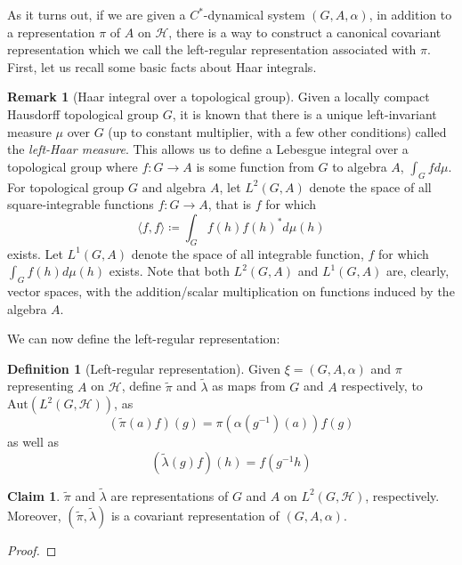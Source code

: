 \documentclass[aps,pra,showpacs,notitlepage,onecolumn,superscriptaddress,nofootinbib]{revtex4-1}
\theoremstyle{definition}
\newtheorem{definition}{Definition}[section]
\newtheorem{remark}{Remark}[section]
\newtheorem{claim}{Claim}[section]
\begin{document}
As it turns out, if we are given a $C^{*}$-dynamical system $(G, A, \alpha)$, in addition to a representation $\pi$ of $A$ on $\mathcal{H}$, there is a way to construct a canonical covariant representation
which we call the left-regular representation associated with $\pi$. First, let us recall some basic facts about Haar integrals.

\begin{remark}[Haar integral over a topological group]
  Given a locally compact Hausdorff topological group $G$, it is known that there is a unique left-invariant measure $\mu$ over $G$ (up to constant multiplier, with a few other conditions) called
  the \emph{left-Haar measure}. This allows us to define a Lebesgue integral over a topological group where $f : G \rightarrow A$ is some function from $G$ to algebra $A$, $\int_{G} f d \mu$. For topological
  group $G$ and algebra $A$, let $L^2(G, A)$ denote the space of all square-integrable functions $f : G \rightarrow A$, that is $f$ for which
  \begin{equation}
   \langle f, f \rangle \coloneqq \displaystyle\int_{G} f(h) f(h)^{*} d\mu(h)
  \end{equation}
  exists. Let $L^1(G, A)$ denote the space of all integrable function, $f$ for which $\int_{G} f(h) d\mu(h)$ exists. Note that both $L^2(G, A)$ and $L^1(G, A)$ are, clearly, vector spaces, with the
  addition/scalar multiplication on functions induced by the algebra $A$.
\end{remark}

\noindent We can now define the left-regular representation:

\begin{definition}[Left-regular representation]
  Given $\xi = (G, A, \alpha)$ and $\pi$ representing $A$ on $\mathcal{H}$, define $\widetilde{\pi}$ and $\widetilde{\lambda}$ as maps from $G$ and $A$ respectively, to $\text{Aut}(L^2(G, \mathcal{H}))$, as
  \begin{equation}
    (\widetilde{\pi}(a) f)(g) = \pi(\alpha(g^{-1})(a)) f(g)
  \end{equation}
  as well as
  \begin{equation}
    (\widetilde{\lambda}(g) f)(h) = f(g^{-1} h)
    \end{equation}
\end{definition}

\begin{claim}
  $\widetilde{\pi}$ and $\widetilde{\lambda}$ are representations of $G$ and $A$ on $L^2(G, \mathcal{H})$, respectively. Moreover, $(\widetilde{\pi}, \widetilde{\lambda})$ is a covariant representation
  of $(G, A, \alpha)$.
\end{claim}
\begin{proof}

\end{proof}
\end{document}
